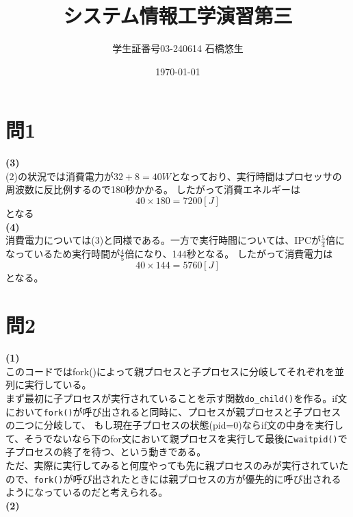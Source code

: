 \documentclass[dvipdfmx]{jlreq}
\title{システム情報工学演習第三}
\author{学生証番号03-240614  石橋悠生}
\date{\today}
\begin{document}
\maketitle
\section{問1}
\textbf{(3)}\\
(2)の状況では消費電力が$32+8 = 40W$となっており、実行時間はプロセッサの周波数に反比例するので180秒かかる。
したがって消費エネルギーは\[
  40 \times 180 = 7200[J]\]となる\\
\textbf{(4)}\\
消費電力については(3)と同様である。一方で実行時間については、IPCが$\frac{5}{4}$倍になっているため実行時間が$\frac{4}{5}$倍になり、144秒となる。
したがって消費電力は\[
  40 \times 144 = 5760[J]
\]となる。\\
\section{問2}
\textbf{(1)}\\
このコードではfork()によって親プロセスと子プロセスに分岐してそれぞれを並列に実行している。\\
まず最初に子プロセスが実行されていることを示す関数\texttt{do\_child()}を作る。if文において\texttt{fork()}が呼び出されると同時に、プロセスが親プロセスと子プロセスの二つに分岐して、
もし現在子プロセスの状態(pid=0)ならif文の中身を実行して、そうでないなら下のfor文において親プロセスを実行して最後に\texttt{waitpid()}で子プロセスの終了を待つ、という動きである。\\
ただ、実際に実行してみると何度やっても先に親プロセスのみが実行されていたので、\texttt{fork()}が呼び出されたときには親プロセスの方が優先的に呼び出されるようになっているのだと考えられる。\\
\textbf{(2)}
\end{document}
